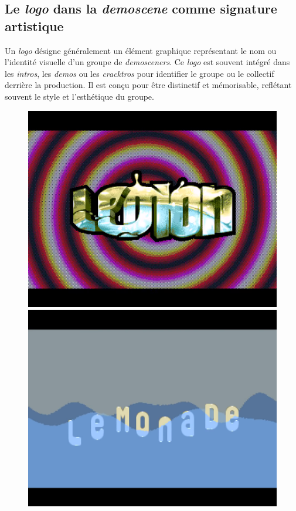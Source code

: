 \subsection*{Le \textit{logo} dans la \textit{demoscene} comme signature artistique}
Un \textit{logo} désigne généralement un élément graphique représentant le nom ou l'identité visuelle d'un groupe de \textit{demosceners}. Ce \textit{logo} est souvent intégré dans les \textit{intros}, les \textit{demos} ou les \textit{cracktros} pour identifier le groupe ou le collectif derrière la production. Il est conçu pour être distinctif et mémorisable, reflétant souvent le style et l'esthétique du groupe.

\begin{figure}[h]
  \begin{minipage}[b]{0.30\linewidth}
    \centering
    \includegraphics[width=\linewidth]{images/demoscene/demos/lemon1.png}
  \end{minipage}
  \hfill
  \begin{minipage}[b]{0.30\linewidth}
    \centering
    \includegraphics[width=\linewidth]{images/demoscene/demos/lemon2.png}

\end{minipage}
\end{figure}
